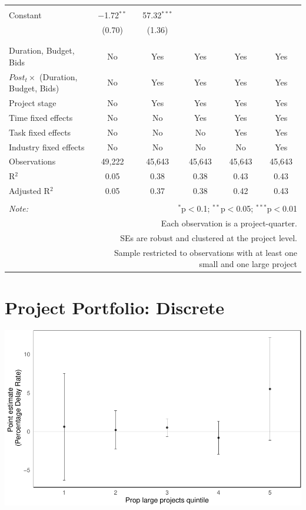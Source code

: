 \documentclass[
]{article}
\begin{document}
\begin{table}[H]
\begin{tabular}{@{\extracolsep{-2pt}}lccccc}
  & & & & & \\ 
 Constant & $-$1.72$^{**}$ & 57.32$^{***}$ &  &  &  \\ 
  & (0.70) & (1.36) &  &  &  \\ 
  & & & & & \\ 
\hline \\[-1.8ex] 
Duration, Budget, Bids & No & Yes & Yes & Yes & Yes \\ 
$Post_t \times $  (Duration, Budget, Bids) & No & Yes & Yes & Yes & Yes \\ 
Project stage & No & Yes & Yes & Yes & Yes \\ 
Time fixed effects & No & No & Yes & Yes & Yes \\ 
Task fixed effects & No & No & No & Yes & Yes \\ 
Industry fixed effects & No & No & No & No & Yes \\ 
Observations & 49,222 & 45,643 & 45,643 & 45,643 & 45,643 \\ 
R$^{2}$ & 0.05 & 0.38 & 0.38 & 0.43 & 0.43 \\ 
Adjusted R$^{2}$ & 0.05 & 0.37 & 0.38 & 0.42 & 0.43 \\ 
\hline 
\hline \\[-1.8ex] 
\textit{Note:}  & \multicolumn{5}{r}{$^{*}$p$<$0.1; $^{**}$p$<$0.05; $^{***}$p$<$0.01} \\ 
 & \multicolumn{5}{r}{Each observation is a project-quarter.} \\ 
 & \multicolumn{5}{r}{SEs are robust and clustered at the project level.} \\ 
 & \multicolumn{5}{r}{Sample restricted to observations with at least one small and one large project} \\ 
\end{tabular} 
\end{table}

\hypertarget{project-portfolio-discrete}{%
\section{Project Portfolio: Discrete}\label{project-portfolio-discrete}}

\includegraphics{qp_first_pc_delay-2_files/figure-latex/project_portfolio_discrete-1.pdf}
\end{document}
